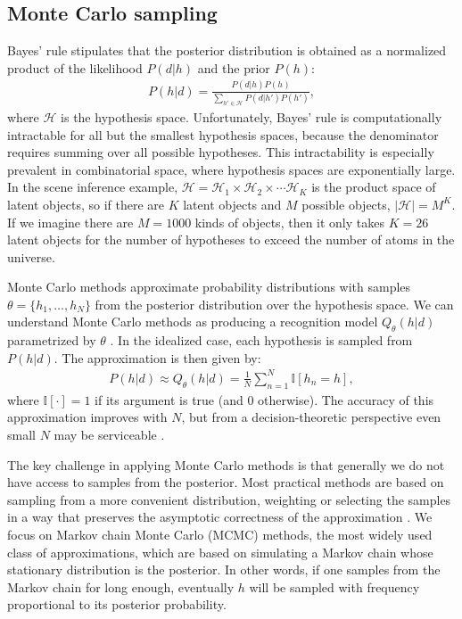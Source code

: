 \subsection{Monte Carlo sampling}
Bayes' rule stipulates that the posterior distribution is obtained as a normalized product of the likelihood $P(d|h)$ and the prior $P(h)$:
\begin{align}
P(h|d) = \frac{P(d|h)P(h)}{\sum_{h' \in \mathcal{H}} P(d|h') P(h')},
\end{align}
where $\mathcal{H}$ is the hypothesis space. Unfortunately, Bayes' rule is computationally intractable for all but the smallest hypothesis spaces, because the denominator requires summing over all possible hypotheses. This intractability is especially prevalent in combinatorial space, where hypothesis spaces are exponentially large. In the scene inference example, $\mathcal{H} = \mathcal{H}_1 \times \mathcal{H}_2 \times \cdots \mathcal{H}_K$ is the product space of latent objects, so if there are $K$ latent objects and $M$ possible objects, $|\mathcal{H}| = M^K$. If we imagine there are $M=1000$ kinds of objects, then it only takes $K=26$ latent objects for the number of hypotheses to exceed the number of atoms in the universe.

Monte Carlo methods approximate probability distributions with samples $\theta = \{h_1,\ldots,h_N \}$ from the posterior distribution over the hypothesis space. We can understand Monte Carlo methods as producing a recognition model $Q_\theta(h|d)$ parametrized by $\theta$ \citep{saeedi17}. In the idealized case, each hypothesis is sampled from $P(h|d)$. The approximation is then given by:
\begin{align}
\textstyle
P(h|d) \approx Q_\theta(h|d) = \frac{1}{N}\sum_{n=1}^N \mathbb{I}[h_n=h],
\end{align}
where $\mathbb{I}[\cdot] = 1$ if its argument is true (and 0 otherwise). The accuracy of this approximation improves with $N$, but from a decision-theoretic perspective even small $N$ may be serviceable \citep{vul2014one,lieder2017anchoring,gershman2015computational}.

The key challenge in applying Monte Carlo methods is that generally we do not have access to samples from the posterior. Most practical methods are based on sampling from a more convenient distribution, weighting or selecting the samples in a way that preserves the asymptotic correctness of the approximation \citep{mackay2003information}. We focus on Markov chain Monte Carlo (MCMC) methods, the most widely used class of approximations, which are based on simulating a Markov chain whose stationary distribution is the posterior. In other words, if one samples from the Markov chain for long enough, eventually $h$ will be sampled with frequency proportional to its posterior probability.

